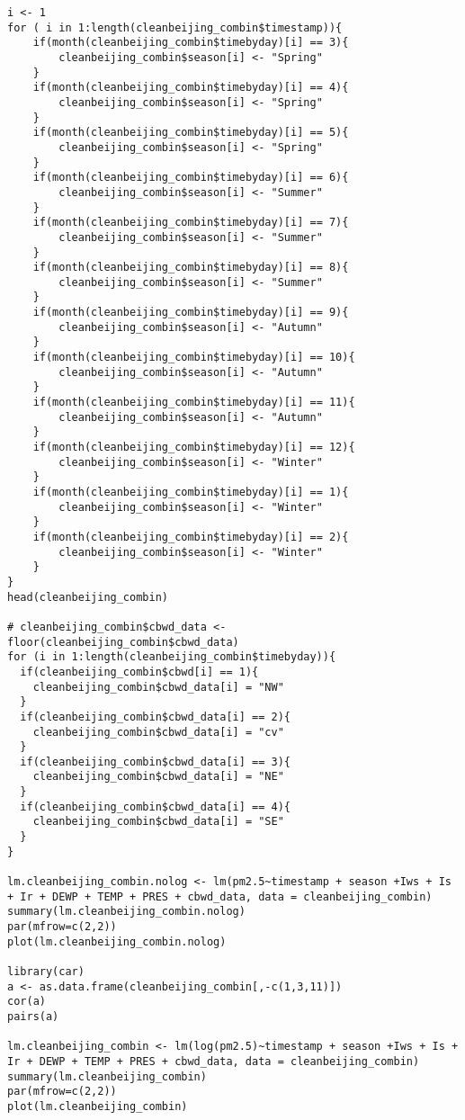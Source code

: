 \begin{verbatim}
i <- 1
for ( i in 1:length(cleanbeijing_combin$timestamp)){
    if(month(cleanbeijing_combin$timebyday)[i] == 3){
        cleanbeijing_combin$season[i] <- "Spring"
    }
    if(month(cleanbeijing_combin$timebyday)[i] == 4){
        cleanbeijing_combin$season[i] <- "Spring"
    }
    if(month(cleanbeijing_combin$timebyday)[i] == 5){
        cleanbeijing_combin$season[i] <- "Spring"
    }
    if(month(cleanbeijing_combin$timebyday)[i] == 6){
        cleanbeijing_combin$season[i] <- "Summer"
    }
    if(month(cleanbeijing_combin$timebyday)[i] == 7){
        cleanbeijing_combin$season[i] <- "Summer"
    }
    if(month(cleanbeijing_combin$timebyday)[i] == 8){
        cleanbeijing_combin$season[i] <- "Summer"
    }
    if(month(cleanbeijing_combin$timebyday)[i] == 9){
        cleanbeijing_combin$season[i] <- "Autumn"
    }
    if(month(cleanbeijing_combin$timebyday)[i] == 10){
        cleanbeijing_combin$season[i] <- "Autumn"
    }
    if(month(cleanbeijing_combin$timebyday)[i] == 11){
        cleanbeijing_combin$season[i] <- "Autumn"
    }
    if(month(cleanbeijing_combin$timebyday)[i] == 12){
        cleanbeijing_combin$season[i] <- "Winter"
    }
    if(month(cleanbeijing_combin$timebyday)[i] == 1){
        cleanbeijing_combin$season[i] <- "Winter"
    }
    if(month(cleanbeijing_combin$timebyday)[i] == 2){
        cleanbeijing_combin$season[i] <- "Winter"
    }
}
head(cleanbeijing_combin)

# cleanbeijing_combin$cbwd_data <- floor(cleanbeijing_combin$cbwd_data)
for (i in 1:length(cleanbeijing_combin$timebyday)){
  if(cleanbeijing_combin$cbwd[i] == 1){
    cleanbeijing_combin$cbwd_data[i] = "NW"
  }
  if(cleanbeijing_combin$cbwd_data[i] == 2){
    cleanbeijing_combin$cbwd_data[i] = "cv"
  }
  if(cleanbeijing_combin$cbwd_data[i] == 3){
    cleanbeijing_combin$cbwd_data[i] = "NE"
  }
  if(cleanbeijing_combin$cbwd_data[i] == 4){
    cleanbeijing_combin$cbwd_data[i] = "SE"
  }
}

lm.cleanbeijing_combin.nolog <- lm(pm2.5~timestamp + season +Iws + Is + Ir + DEWP + TEMP + PRES + cbwd_data, data = cleanbeijing_combin)
summary(lm.cleanbeijing_combin.nolog)
par(mfrow=c(2,2))
plot(lm.cleanbeijing_combin.nolog)

library(car)
a <- as.data.frame(cleanbeijing_combin[,-c(1,3,11)])
cor(a)
pairs(a)

lm.cleanbeijing_combin <- lm(log(pm2.5)~timestamp + season +Iws + Is + Ir + DEWP + TEMP + PRES + cbwd_data, data = cleanbeijing_combin)
summary(lm.cleanbeijing_combin)
par(mfrow=c(2,2))
plot(lm.cleanbeijing_combin)


\end{verbatim}
